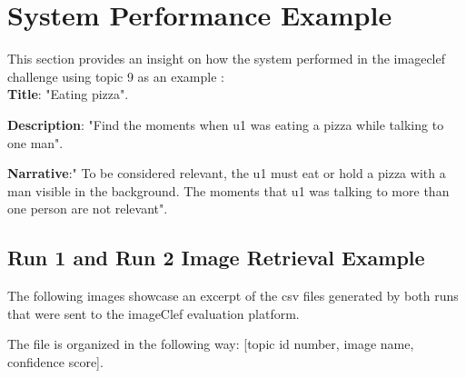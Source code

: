 \section{System Performance Example}
\label{sec:example}

This section provides an insight on how the system performed in the imageclef challenge using topic 9 as an example : \\

\textbf{Title}: "Eating pizza".

\textbf{Description}: "Find the moments when u1 was eating a pizza
while talking to one man".

\textbf{Narrative}:" To be considered relevant, the u1 must eat or
hold a pizza with a man visible in the background. The moments that
u1 was talking to more than one person are not relevant".


\subsection{Run 1 and Run 2 Image Retrieval Example}

The following images showcase an excerpt of the csv files generated by both runs that were sent to the imageClef evaluation platform.

The file is organized in the following way: [topic id number, image name, confidence score].


